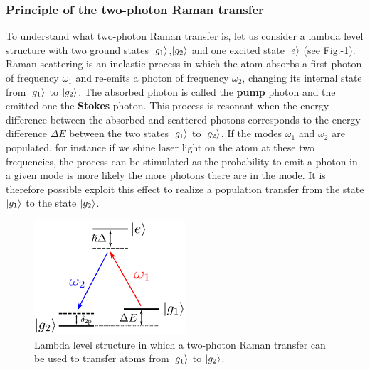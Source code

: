  

\subsubsection{Principle of the two-photon Raman transfer}


To understand what two-photon Raman transfer is, let us consider a lambda level structure with two ground states $\ket{g_1}$,$\ket{g_2}$ and one excited state $\ket{e}$ (see Fig.-\ref{fig:raman_level}). Raman scattering is an inelastic process in which the atom absorbs a first photon of frequency $\omega_1$ and re-emits a photon of frequency $\omega_2$, changing its internal state from $\ket{g_1}$ to $\ket{g_2}$. The absorbed photon is called the \textbf{pump} photon and the emitted one the \textbf{Stokes} photon. This process is resonant when the energy difference between the absorbed and scattered photons corresponds to the energy difference $\Delta E$ between the two states $\ket{g_1}$ to $\ket{g_2}$. If the modes $\omega_1$ and $\omega_2$ are populated, for instance if we shine laser light on the atom at these two frequencies, the process can be stimulated as the probability to emit a photon in a given mode is more likely the more photons there are in the mode. It is therefore possible exploit this effect to realize a population transfer from the state $\ket{g_1}$ to the state $\ket{g_2}$.


\begin{figure}
    \centering
    \includegraphics[width=0.5\textwidth]{Fig/Chapter3/fig_raman_theo.png}
    \caption[Lambda level structure for two-photon Raman transfer]{Lambda level structure in which a two-photon Raman transfer can be used to transfer atoms from $\ket{g_1}$ to $\ket{g_2}$.}
    \label{fig:raman_level}
\end{figure}

